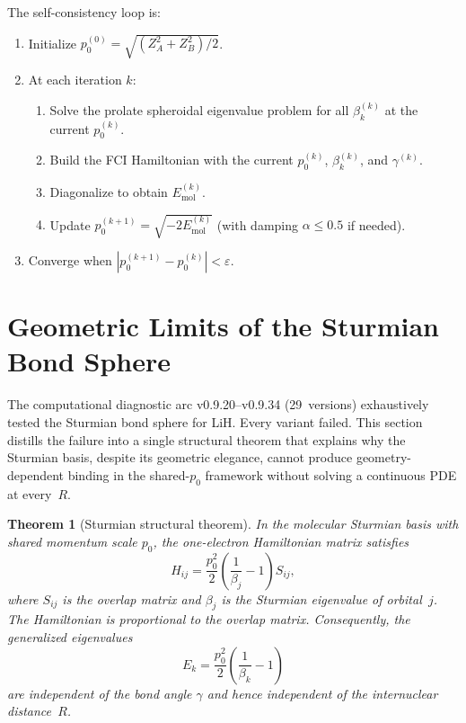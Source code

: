 \documentclass[aps,pra,twocolumn,superscriptaddress,longbibliography]{revtex4-2}
\newtheorem{theorem}{Theorem}
\begin{document}
The self-consistency loop is:
\begin{enumerate}
\item Initialize $p_0^{(0)} = \sqrt{(Z_A^2 + Z_B^2)/2}$.
\item At each iteration $k$:
  \begin{enumerate}
  \item Solve the prolate spheroidal eigenvalue problem for all
  $\beta_k^{(k)}$ at the current $p_0^{(k)}$.
  \item Build the FCI Hamiltonian with the current $p_0^{(k)}$,
  $\beta_k^{(k)}$, and $\gamma^{(k)}$.
  \item Diagonalize to obtain $E_{\text{mol}}^{(k)}$.
  \item Update $p_0^{(k+1)} = \sqrt{-2E_{\text{mol}}^{(k)}}$
  (with damping $\alpha \leq 0.5$ if needed).
  \end{enumerate}
\item Converge when $|p_0^{(k+1)} - p_0^{(k)}| < \varepsilon$.
\end{enumerate}


\section{Geometric Limits of the Sturmian Bond Sphere}
\label{sec:structural_theorem}

The computational diagnostic arc v0.9.20--v0.9.34 (29~versions) exhaustively
tested the Sturmian bond sphere for LiH.  Every variant failed.  This section
distills the failure into a single structural theorem that explains why the
Sturmian basis, despite its geometric elegance, cannot produce
geometry-dependent binding in the shared-$p_0$ framework without solving a
continuous PDE at every~$R$.

\begin{theorem}[Sturmian structural theorem]
\label{thm:structural}
In the molecular Sturmian basis with shared momentum scale $p_0$,
the one-electron Hamiltonian matrix satisfies
\begin{equation}
H_{ij} = \frac{p_0^2}{2}\!\left(\frac{1}{\beta_j} - 1\right) S_{ij},
\label{eq:H_prop_S}
\end{equation}
where $S_{ij}$ is the overlap matrix and $\beta_j$ is the Sturmian
eigenvalue of orbital~$j$.  The Hamiltonian is proportional to the overlap
matrix.  Consequently, the generalized eigenvalues
\begin{equation}
E_k = \frac{p_0^2}{2}\!\left(\frac{1}{\beta_k} - 1\right)
\label{eq:E_geom_indep}
\end{equation}
are independent of the bond angle $\gamma$ and hence independent of the
internuclear distance~$R$.
\end{theorem}
\end{document}
